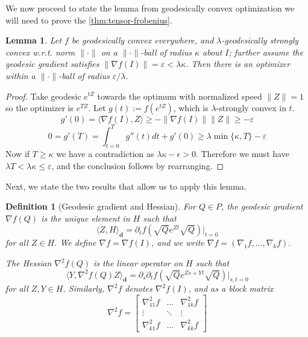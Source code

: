 \documentclass{article}
\newtheorem{lemma}[theorem]{Lemma}
\newtheorem{definition}{Definition}
\renewcommand{\vec}{\bm}
\newcommand\eps{\varepsilon}
\newcommand{\TODO}[1]{{\color{blue}[TODO: #1]}}
\begin{document}
We now proceed to state the lemma from geodesically convex optimization we will need to prove the \cref{thm:tensor-frobenius}.




\begin{lemma}\label{lem:convex-ball} Let $f$ be geodesically convex everywhere, and $\lambda$-geodesically strongly convex w.r.t. norm $\|\cdot\|$ on a $\| \cdot \|$-ball of radius $\kappa$ about $I$; further assume the geodesic gradient satisfies $\|\nabla f(I)\| = \eps < \lambda \kappa$. Then there is an optimizer within a $\|\cdot\|$-ball of radius $\eps/\lambda$. 
\end{lemma}
\begin{proof}
Take geodesic $e^{t Z}$ towards the optimum with normalized speed $\|Z\| = 1$ so the optimizer is $e^{T Z}$. Let $g(t) := f(e^{tZ})$, which is $\lambda$-strongly convex in $t$. 
\[ g'(0) = \langle \nabla f(I), Z \rangle \geq - \|\nabla f(I)\| \|Z\| \geq - \eps   \]
\[ 0 = g'(T) = \int_{t=0}^{T} g''(t) dt + g'(0) \geq \lambda \min\{\kappa,T\} - \eps     \]
Now if $T \geq \kappa$ we have a contradiction as $\lambda \kappa - \epsilon > 0$. Therefore we must have $\lambda T < \lambda \kappa \leq \eps$, and the conclusion follows by rearranging. 
\end{proof}
Next, we state the two results that allow us to apply this lemma. \begin{definition}[Geodesic gradient and Hessian]
For $Q \in P$, the geodesic gradient $\nabla f(Q)$ is the unique element in $H$ such that 
$$\langle Z, H \rangle_{\vec d} = \partial_t f(\sqrt{Q}e^{Zt}\sqrt{Q})|_{t = 0}$$
for all $Z \in H$. We define $\nabla f = \nabla f(I)$, and we write $\nabla f = (\nabla_1 f, \dots, \nabla_k f).$

The Hessian $\nabla^2 f(Q)$ is the linear operator on $H$ such that 
$$\langle Y,  \nabla^2 f(Q) Z \rangle_{\vec d} = \partial_s \partial_t f(\sqrt{Q}e^{Zs + Yt}\sqrt{Q})|_{s,t = 0}$$
for all $Z, Y \in H$. Similarly, $\nabla^2 f$ denotes $\nabla^2 f(I)$, and as a block matrix
$$\nabla^2 f = \begin{bmatrix} 
\nabla_{11}^2 f &  \dots &  \nabla^2_{1k} f \\
\vdots &  \ddots &  \vdots\\
 \nabla_{k1}^2 f &  \dots &  \nabla_{kk}^2 f 
 \end{bmatrix}$$
\end{definition}
\end{document}
